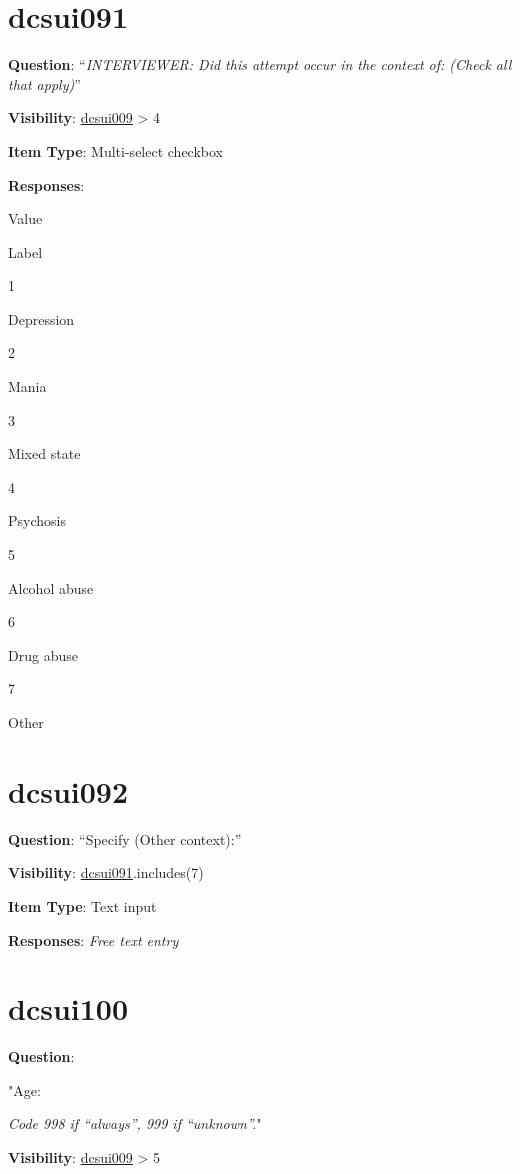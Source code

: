 \documentclass[]{book}
\begin{document}
\hypertarget{dcsui091}{%
\section{dcsui091}\label{dcsui091}}

\textbf{Question}: ``\emph{INTERVIEWER: Did this attempt occur in the context of: (Check all that apply)}''

\textbf{Visibility}: \protect\hyperlink{dcsui009}{dcsui009} \textgreater{} 4

\textbf{Item Type}: Multi-select checkbox

\textbf{Responses}:

Value

Label

1

Depression

2

Mania

3

Mixed state

4

Psychosis

5

Alcohol abuse

6

Drug abuse

7

Other

\hypertarget{dcsui092}{%
\section{dcsui092}\label{dcsui092}}

\textbf{Question}: ``Specify (Other context):''

\textbf{Visibility}: \protect\hyperlink{dcsui091}{dcsui091}.includes(7)

\textbf{Item Type}: Text input

\textbf{Responses}: \emph{Free text entry}

\hypertarget{dcsui100}{%
\section{dcsui100}\label{dcsui100}}

\textbf{Question}:

"Age:

\emph{Code 998 if ``always'', 999 if ``unknown''.}"

\textbf{Visibility}: \protect\hyperlink{dcsui009}{dcsui009} \textgreater{} 5
\end{document}
